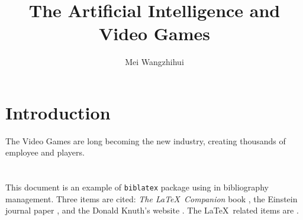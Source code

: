 \documentclass[a4paper,10pt]{article}
\title{The Artificial Intelligence and Video Games}
\author{Mei Wangzhihui}
\begin{document}
\maketitle
\section{Introduction}
The Video Games are long becoming the new industry, creating thousands of employee and players.
 
\section{}
\section{}
This document is an example of \texttt{biblatex} package using in bibliography management. Three items are cited: \textit{The \LaTeX\ Companion} book \cite{latexcompanion}, the Einstein journal paper \cite{einstein}, and the Donald Knuth's website \cite{knuthwebsite}. The \LaTeX\ related items are \cite{latexcompanion,knuthwebsite}. 
 
\medskip

\printbibliography
\end{document}
